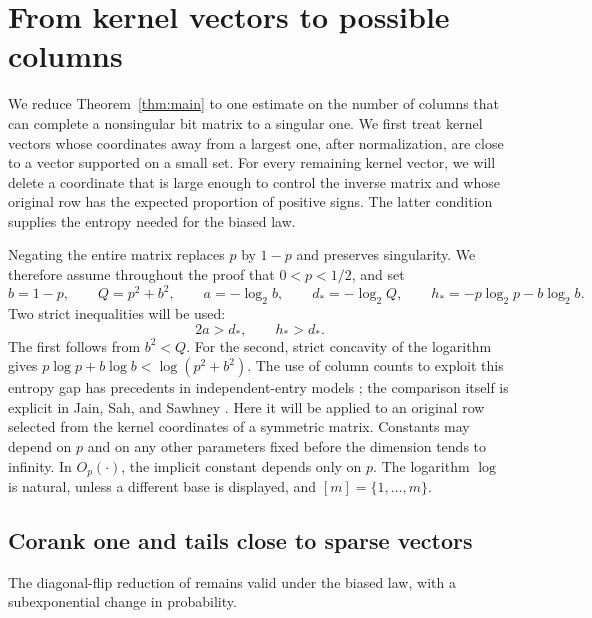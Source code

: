 \section{From kernel vectors to possible columns}\label{sec:reductions}

We reduce Theorem~\ref{thm:main} to one estimate on the number of
columns that can complete a nonsingular bit matrix to a singular one.
We first treat kernel vectors whose coordinates away from a largest
one, after normalization, are close to a vector supported on a small
set. For every remaining kernel vector, we will delete
a coordinate that is large enough to control the inverse matrix and
whose original row has the expected proportion of positive signs.
The latter condition supplies the entropy needed for the biased law.

Negating the entire matrix replaces \(p\) by \(1-p\) and preserves
singularity. We therefore assume throughout the proof that \(0<p<1/2\),
and set
\begin{equation}\label{eq:rate-constants}
 b=1-p,\qquad Q=p^2+b^2,\qquad
 a=-\log_2 b,\qquad d_*=-\log_2 Q,\qquad
 h_*=-p\log_2 p-b\log_2 b.
\end{equation}
Two strict inequalities will be used:
\begin{equation}\label{eq:rate-margins}
 2a>d_*,\qquad h_*>d_*.
\end{equation}
The first follows from \(b^2<Q\). For the second, strict concavity of
the logarithm gives
\(p\log p+b\log b<\log(p^2+b^2)\).
The use of column counts to exploit this entropy gap has precedents
in independent-entry models
\cite[Section~2.1]{LitvakTikhomirov};
the comparison itself is explicit in
Jain, Sah, and Sawhney \cite[Section~6]{JainSahSawhneyDiscrete}.
Here it will be applied to an original row selected from the kernel
coordinates of a symmetric matrix.
Constants may depend on \(p\) and on any other parameters fixed before
the dimension tends to infinity. In \(O_p(\cdot)\), the implicit
constant depends only on \(p\). The logarithm \(\log\) is natural,
unless a different base is displayed, and \([m]=\{1,\ldots,m\}\).

\subsection{Corank one and tails close to sparse vectors}

The diagonal-flip reduction of
\cite[Lemma~2.4]{SymmetricRate} remains valid under the biased law,
with a subexponential change in probability.

